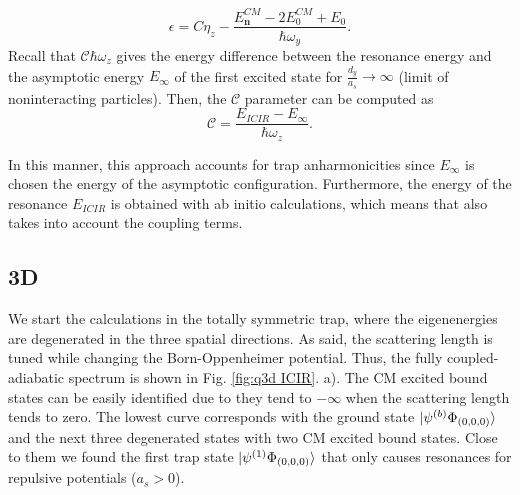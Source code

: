 \documentclass[aps,pre,twocolumn,superscriptaddress,showpacs]{revtex4-1}
\newcommand{\bfeq}[1]{{\boldsymbol{#1}}}
\begin{document}
\begin{equation}
\epsilon = C\eta_z - \frac{E^{CM}_{\bfeq{n}} - 2E^{CM}_0 + E_0}{\hbar \omega_y}.
\label{eq:final energy shift}
\end{equation}
Recall that $\mathcal{C} \hbar \omega_z$ gives the energy difference between the resonance energy and the asymptotic energy $E_{\infty}$ of the first excited state for $\frac{d_y}{a_s} \to \infty$ (limit of noninteracting particles). Then, the $\mathcal{C}$ parameter can be computed as
\begin{equation}
\mathcal{C} = \frac{E_{ICIR} - E_{\infty}}{\hbar \omega_z}.
\end{equation}
	
In this manner, this approach accounts for trap anharmonicities since $E_{\infty}$ is chosen the energy of the asymptotic configuration. Furthermore, the energy of the resonance $E_{ICIR}$ is 
obtained with ab initio calculations, which means that also takes into account the coupling terms.    

\subsection{3D} \label{subsec:3D}
We start the calculations in the totally symmetric trap, where the eigenenergies are degenerated in the three spatial directions. As said, the scattering length is tuned while changing the Born-Oppenheimer potential. Thus, the fully coupled-adiabatic spectrum is shown in Fig. \ref{fig:q3d ICIR}. a). The CM excited bound states can be easily identified due to they tend to $-\infty$ when the scattering length tends to zero. The lowest curve corresponds with the ground state $\ket{ \psi^{(b)} \Phi_{(0,0,0)} }$ and the next three degenerated states with two CM excited bound states. Close to them we found the first trap state $\ket{ \psi^{(1)} \Phi_{(0,0,0)}} $ that only causes resonances for repulsive potentials ($a_s > 0$). 
\end{document}
